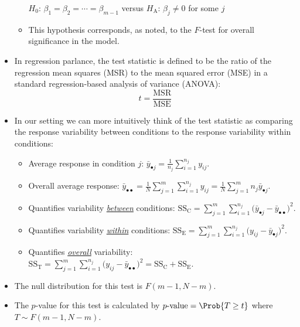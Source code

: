 \begin{itemize}
\begin{itemize}
                        \centerline{$ H_0 $: $ \beta_1=\beta_2=\cdots=\beta_{m-1} $ versus $ H_\text{A} $: $ \beta_j\ne 0 $ for some $ j$}
                  \item This hypothesis corresponds, as noted, to the $ F $-test for overall significance in the model.
            \end{itemize}
      \item  In regression parlance, the test statistic is defined to be the ratio of the
            regression mean squares (MSR)
            to the mean squared error (MSE) in a standard regression-based analysis of variance (ANOVA):
            \[ t=\frac{\text{MSR}}{\text{MSE}} \]
      \item In our setting we can more intuitively think of the test
            statistic as comparing the response variability
            between conditions to the response variability within conditions:
            \begin{itemize}
                  \item Average response in condition $ j $: $ \displaystyle \bar{y}_{\bullet j}=\frac{1}{n_j} \sum_{i=1}^{n_j} y_{ij} $.
                  \item Overall average response: $ \displaystyle \bar{y}_{\bullet\bullet}=\frac{1}{N} \sum_{j=1}^{m} \sum_{i=1}^{n_j} y_{ij}=\frac{1}{N} \sum_{j=1}^{m} n_j\bar{y}_{\bullet j} $.
                  \item Quantifies variability \underline{\emph{between}} conditions:
                        $ \displaystyle \text{SS}_\text{C}=\sum_{j=1}^{m} \sum_{i=1}^{n_j} \bigl(\bar{y}_{\bullet j}-\bar{y}_{\bullet\bullet}\bigr)^2 $.
                  \item Quantifies variability \underline{\emph{within}} conditions:
                        $ \displaystyle \text{SS}_\text{E}=\sum_{j=1}^{m} \sum_{i=1}^{n_j} \bigl(y_{ij}-\bar{y}_{\bullet j}\bigr)^2 $.
                  \item Quantifies \underline{\emph{overall}} variability:
                        $ \displaystyle \text{SS}_\text{T}=\sum_{j=1}^{m} \sum_{i=1}^{n_j} \bigl(y_{ij}-\bar{y}_{\bullet\bullet}\bigr)^2=\text{SS}_\text{C}+\text{SS}_\text{E} $.
            \end{itemize}
      \item The null distribution for this test is $ F(m-1,N-m) $.
      \item The $ p $-value for this test is calculated by
            $ p\text{-value}=\Prob{T\ge t} $ where $ T \sim F(m-1,N-m) $.
\end{itemize}
